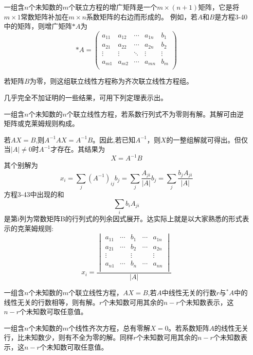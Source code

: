 \begin{definition}
    一组含$n$个未知数的$m$个联立方程的增广矩阵是一个$m \times (n+1)$矩阵，它是将$m \times 1$常数矩阵补加在$m \times n$系数矩阵的右边而形成的。
    例如，若$A$和$B$是方程3-40中的矩阵，则增广矩阵$*A$为
    \[
    *A=
    \begin{pmatrix}
        a_{11} & a_{12} & \cdots & a_{1n} & b_{1} \\
        a_{21} & a_{22} & \cdots & a_{2n} & b_{2} \\
        \vdots & \vdots & \ddots & \vdots & \vdots \\
        a_{m1} & a_{m2} & \cdots & a_{mn} & b_{m} \\
    \end{pmatrix}
    \tag{3-41}
    \]

    若矩阵$B$为零，则这组联立线性方程称为齐次联立线性方程组。
\end{definition}

几乎完全不加证明的一些结果，可用下列定理表示出。

\begin{theorem}
    一组含$n$个未知数的$n$个联立线性方程，若系数行列式不为零则有解。其解可由逆矩阵或克莱姆规则构成。
\end{theorem}

若$AX=B$,则$A^{-1}AX=A^{-1}B$。因此,若已知$A^{-1}$，则$X$的一整组解就可得出。但仅当$|A| \neq 0$时$A^{-1}$才存在。其结果为
\[X=A^{-1}B \tag{3-42}\]
其个别解为
\[x_i=\sum_j(A^{-1})_{ij}b_j=\sum_j\frac{A_{ji}}{|A|}b_j=\sum_j\frac{b_jA_{ji}}{|A|} \tag{3-43}\]
方程3-43中出现的和
\[\sum_ib_iA_{ji}\]
是第i列为常数矩阵B的行列式的列余因式展开。达实际上就是以大家熟悉的形式表示的克莱姆规则:
\[x_i=\frac{
\begin{vmatrix}
    a_{11} & \cdots & b_{1} & \cdots & a_{1n} \\
    a_{21} & \cdots & b_{2} & \cdots & a_{2n} \\
    \vdots & & \vdots & & \vdots \\
    a_{n1} & \cdots & b_{n} & \cdots & a_{nn} \\
\end{vmatrix}   
}{
|A|
}\tag{3-44}\]

\begin{theorem}
    一组含$n$个未知数的$m$个联立线性方程，$AX=B$,若$A$中线性无关的行数$r$与$^*A$中的线性无关的行数相等，则有解。$r$个未知数可用其余的$n-r$个未知数表示，这$n-r$个未知数可取任意值。

    一组含$n$个未知数的$m$个线性齐次方程，总有零解$X=0$。若系数矩阵$A$的线性无关行，比未知数少，则有不全为零的解。同样$r$个未知数可用其余的$n-r$个未知数表示，这$n-r$个未知数可取任意值。
\end{theorem}

